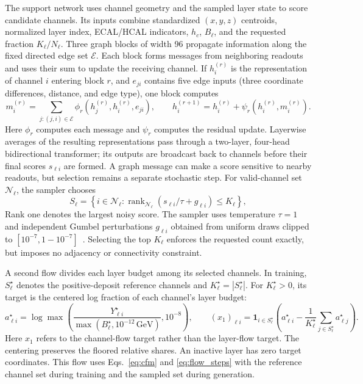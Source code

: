 \documentclass[11pt]{article}
\newcommand{\GeV}{\,\mathrm{GeV}}
\begin{document}
The support network uses channel geometry and the sampled layer state to score candidate channels. Its inputs combine standardized $(x,y,z)$ centroids, normalized layer index, ECAL/HCAL indicators, $h_c$, $B_\ell$, and the requested fraction $K_\ell/N_\ell$. Three graph blocks of width 96 propagate information along the fixed directed edge set $\mathcal E$. Each block forms messages from neighboring readouts and uses their sum to update the receiving channel. If $h_i^{(r)}$ is the representation of channel $i$ entering block $r$, and $e_{ji}$ contains five edge inputs (three coordinate differences, distance, and edge type), one block computes
\begin{equation}
 m_i^{(r)}=\sum_{j:(j,i)\in\mathcal E}
 \phi_r(h_j^{(r)},h_i^{(r)},e_{ji}),\qquad
 h_i^{(r+1)}=h_i^{(r)}+\psi_r(h_i^{(r)},m_i^{(r)}).
 \label{eq:message}
\end{equation}
Here $\phi_r$ computes each message and $\psi_r$ computes the residual update. Layerwise averages of the resulting representations pass through a two-layer, four-head bidirectional transformer; its outputs are broadcast back to channels before their final scores $s_{\ell i}$ are formed. A graph message can make a score sensitive to nearby readouts, but selection remains a separate stochastic step. For valid-channel set $\mathcal N_\ell$, the sampler chooses
\begin{equation}
 S_\ell=\left\{i\in\mathcal N_\ell:
 \operatorname{rank}_{\mathcal N_\ell}(s_{\ell i}/\tau+g_{\ell i})\leq K_\ell\right\},
 \label{eq:topk}
\end{equation}
Rank one denotes the largest noisy score. The sampler uses temperature $\tau=1$ and independent Gumbel perturbations $g_{\ell i}$ obtained from uniform draws clipped to $[10^{-7},1-10^{-7}]$~\cite{gumbeltopk}. Selecting the top $K_\ell$ enforces the requested count exactly, but imposes no adjacency or connectivity constraint.

A second flow divides each layer budget among its selected channels. In training, $S_\ell^\star$ denotes the positive-deposit reference channels and $K_\ell^\star=|S_\ell^\star|$. For $K_\ell^\star>0$, its target is the centered log fraction of each channel's layer budget:
\begin{equation}
 a_{\ell i}^\star=\log\max\!\left(
 \frac{Y_{\ell i}^\star}{\max(B_\ell^\star,10^{-12}\GeV)},10^{-8}\right),\qquad
 (x_1)_{\ell i}=\mathbf 1_{i\in S_\ell^\star}
 \left(a_{\ell i}^\star-\frac{1}{K_\ell^\star}
 \sum_{j\in S_\ell^\star}a_{\ell j}^\star\right).
 \label{eq:share_target}
\end{equation}
Here $x_1$ refers to the channel-flow target rather than the layer-flow target. The centering preserves the floored relative shares. An inactive layer has zero target coordinates. This flow uses Eqs.~\eqref{eq:cfm} and \eqref{eq:flow_steps} with the reference channel set during training and the sampled set during generation.
\end{document}
